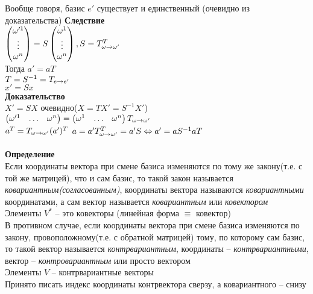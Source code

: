 \documentclass[12pt]{article}
\begin{document}
Вообще говоря, базис $e'$ существует и единственный (очевидно из доказательства)
\textbf{Следствие}\\
$\begin{pmatrix}
    \omega'^1\\\vdots\\\omega^n
\end{pmatrix} = S\begin{pmatrix}
    \omega^1\\\vdots\\\omega^n
\end{pmatrix}, S = T_{\omega \rightarrow \omega'}^T$\\
Тогда $a'=aT$\\
$T = S^{-1} = T_{e\rightarrow e'}$\\
$x'=Sx$\\
\textbf{Доказательство}\\
$X' = SX$ очевидно($X=TX'=S^{-1}X'$)\\
$\begin{pmatrix}
    \omega'^1 & \ldots & \omega^n
\end{pmatrix} = \begin{pmatrix}
    \omega^1 & \ldots & \omega^n
\end{pmatrix} T_{\omega \rightarrow \omega'}$\\
$a^T = T_{\omega\rightarrow \omega'}(a')^T$
$a=a'T^T_{\omega\rightarrow\omega'} = a'S \Leftrightarrow a'=aS^{-1}aT$\\\\
\textbf{Определение}\\
Если координаты вектора при смене базиса изменяются по тому же закону(т.е. с той же матрицей), что и сам базис, то такой закон называется \textit{ковариантным(согласованным)}, координаты вектора называются \textit{ковариантными} координатами, а сам вектор называется \textit{ковариантным} или \textit{ковектором}\\
Элементы $V^*$ -- это ковекторы (линейная форма $\equiv$ ковектор)\\
В противном случае, если координаты вектора при смене базиса изменяются по закону, провоположному(т.е. с обратной матрицей) тому, по которому сам базис, то такой вектор называется \textit{контрвариантным}, координаты -- \textit{контрвариантными}, вектор -- \textit{контровариантным} или просто вектором\\
Элементы $V$ -- контрвариантные векторы\\
Принято писать индекс координаты контрвектора сверзу, а ковариантного -- снизу\\\\
\end{document}
